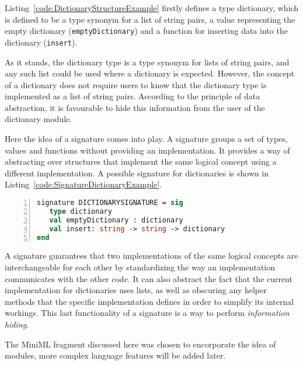 \documentclass[10pt,a4paper]{report}
\begin{document}
Listing~\ref{code:DictionaryStructureExample} firstly defines a type dictionary, which is defined to be a type synonym for a list of string pairs, a value representing the empty dictionary (\texttt{emptyDictionary}) and a function for inserting data into the dictionary (\texttt{insert}).

As it stands, the dictionary type is a type synonym for lists of string pairs, and any such list could be used where a dictionary is expected. However, the concept of a dictionary does not require users to know that the dictionary type is implemented as a list of string pairs. According to the principle of data abstraction, it is favourable to hide this information from the user of the dictionary module.

Here the idea of a signature comes into play. A signature groups a set of types, values and functions without providing an implementation. It provides a way of abstracting over structures that implement the same logical concept using a different implementation. A possible signature for dictionaries is shown in Listing~\ref{code:SignatureDictionaryExample}.
~
\begin{lstlisting}[frame=single, language=ML, caption=An example signature showing the declaration of a dictionary in ML, label=code:SignatureDictionaryExample, numbers=left]
signature DICTIONARYSIGNATURE = sig
   type dictionary
   val emptyDictionary : dictionary
   val insert: string -> string -> dictionary
end
\end{lstlisting}

A signature guarantees that two implementations of the same logical concepts are interchangeable for each other by standardizing the way an implementation communicates with the other code. It can also abstract the fact that the current implementation for dictionaries uses lists, as well as obscuring any helper methods that the specific implementation defines in order to simplify its internal workings. This last functionality of a signature is a way to perform \emph{information hiding}.


The \mbox{MiniML} fragment discussed here was chosen to encorporate the idea of modules, more complex language features will be added later.
\end{document}
